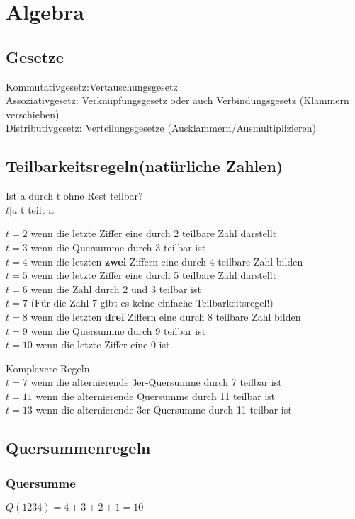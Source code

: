 \section{Algebra}
\subsection{Gesetze}
Kommutativgesetz:Vertauschungsgesetz \\
Assoziativgesetz: Verknüpfungsgesetz oder auch Verbindungsgesetz (Klammern verschieben) \\
Distributivgesetz: Verteilungsgesetze (Ausklammern/Ausmultiplizieren)


\subsection{Teilbarkeitsregeln(natürliche Zahlen)}
Ist a durch t ohne Rest teilbar?\\
$t|a$ t teilt a 


$t=2$ wenn die letzte Ziffer eine durch 2 teilbare Zahl darstellt\\
$t=3$ wenn die Quersumme durch 3 teilbar ist\\
$t=4$ wenn die letzten \textbf{zwei} Ziffern eine durch 4 teilbare Zahl bilden\\
$t=5$ wenn die letzte Ziffer eine durch 5 teilbare Zahl darstellt\\
$t=6$ wenn die Zahl durch 2 und 3 teilbar ist\\
$t=7$ (Für die Zahl 7 gibt es keine einfache Teilbarkeitsregel!)\\
$t=8$ wenn die letzten \textbf{drei} Ziffern eine durch 8 teilbare Zahl bilden\\
$t=9$ wenn die Quersumme durch 9 teilbar ist\\
$t=10$ wenn die letzte Ziffer eine 0 ist

Komplexere Regeln \\
$t=7$ wenn die alternierende 3er-Quersumme durch 7 teilbar ist\\
$t=11$ wenn die alternierende Quersumme durch 11 teilbar ist\\
$t=13$ wenn die alternierende 3er-Quersumme durch 11 teilbar ist


\subsection{Quersummenregeln}
\subsubsection{Quersumme}
$Q(1234)=4+3+2+1=10$

